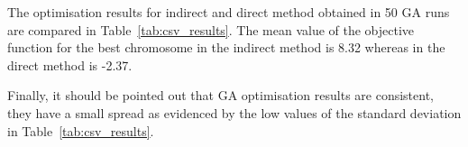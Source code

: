 \documentclass[preprint,12pt]{elsarticle}
\begin{document}
The optimisation results for indirect and direct method obtained in 50 GA runs are compared in Table~\ref{tab:csv_results}. The mean value of the objective function for the best chromosome in the indirect method is 8.32 whereas in the direct method is -2.37.

Finally, it should be pointed out that GA optimisation results are consistent, they have a small spread as evidenced by the low values of the standard deviation in Table~\ref{tab:csv_results}. 






\end{document}
